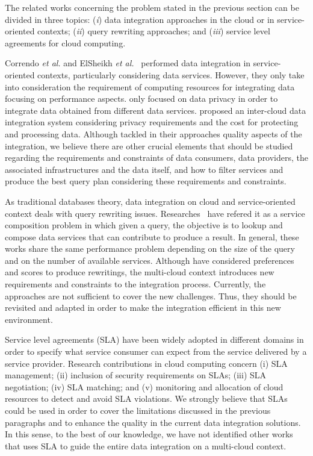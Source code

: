 The related works concerning the problem stated in the previous section can be divided in three topics: (\textit{i}) data integration approaches in the cloud or in service-oriented contexts; (\textit{ii}) query rewriting approaches; and (\textit{iii}) service level agreements for cloud computing.

Correndo \textit{et al.} and ElSheikh \textit{et al.}~\cite{Correndo2010,ElSheikh2013} performed data integration in service-oriented contexts, particularly considering data services. However, they only take into consideration the requirement of computing resources for integrating data focusing on performance aspects. \cite{YauY08} only focused on data privacy in order to integrate data obtained from different data services. \cite{Tian2010} proposed an inter-cloud data integration system considering privacy requirements and the cost for protecting and processing data. Although \cite{Tian2010,YauY08} tackled in their approaches quality aspects of the integration, we believe there are other crucial elements that should be studied regarding the requirements and constraints of data consumers, data providers, the associated infrastructures and the data itself, and how to filter services and produce the best query plan considering these requirements and constraints.

As traditional databases theory, data integration on cloud and service-oriented context deals with query rewriting issues. Researches~\cite{ba2014,Barhamgi2010,Benouaret2011,Umberto} have refered it as a service composition problem in which given a query, the objective is to lookup and compose data services that can contribute to produce a result. In general, these works share the same performance problem depending on the size of the query and on the number of available services. Although \cite{ba2014,Benouaret2011} have considered preferences and scores to produce rewritings, the multi-cloud context introduces new requirements and constraints to the integration process. Currently, the approaches are not sufficient to cover the new challenges. Thus, they should be revisited and adapted in order to make the integration efficient in this new environment. 

Service level agreements (SLA) have been widely adopted in different domains in order to specify what service consumer can expect from the service delivered by a service provider. Research contributions in cloud computing concern (i) SLA management; (ii) inclusion of security requirements on SLAs; (iii) SLA negotiation; (iv) SLA matching;  and (v) monitoring and allocation of cloud resources to detect and avoid SLA violations. 
We strongly believe that SLAs could be used in order to cover the limitations discussed in the previous paragraphs and to enhance the quality in the current data integration solutions. In this sense, to the best of our knowledge, we have not identified other works that uses SLA to guide the entire data integration on a multi-cloud context.
